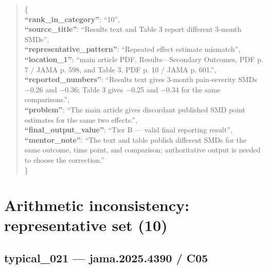 \documentclass[
  letterpaper,
  9pt]{extreport}
\begin{document}
\begin{quote}
\{\\
\textbf{``rank\_in\_category''}: ``10'',\\
\textbf{``source\_title''}: ``Results text and Table 3 report different
3-month SMDs'',\\
\textbf{``representative\_pattern''}: ``Repeated effect estimate
mismatch'',\\
\textbf{``location\_1''}: ``main article PDF, Results---Secondary
Outcomes, PDF p. 7 / JAMA p. 598, and Table 3, PDF p. 10 / JAMA p.
601.'',\\
\textbf{``reported\_numbers''}: ``Results text gives 3-month
pain-severity SMDs −0.26 and −0.36; Table 3 gives −0.25 and −0.34 for
the same comparisons.'',\\
\textbf{``problem''}: ``The main article gives discordant published SMD
point estimates for the same two effects.'',\\
\textbf{``final\_output\_value''}: ``Tier B --- valid final reporting
result'',\\
\textbf{``mentor\_note''}: ``The text and table publish different SMDs
for the same outcome, time point, and comparison; authoritative output
is needed to choose the correction.''\\
\}
\end{quote}

\hypertarget{arithmetic-inconsistency-representative-set-10}{%
\section{Arithmetic inconsistency: representative set
(10)}\label{arithmetic-inconsistency-representative-set-10}}

\hypertarget{typical_021--jama20254390--c05}{%
\subsection{typical\_021 --- jama.2025.4390 /
C05}\label{typical_021--jama20254390--c05}}
\end{document}
